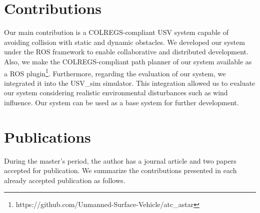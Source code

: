     
    \section{Contributions}
    
    
     Our main contribution is a \ac{COLREGS}-compliant \ac{USV} system capable of avoiding collision with static and dynamic obstacles. We developed our system under the \ac{ROS} framework to enable collaborative and distributed development. Also, we make the COLREGS-compliant path planner of our system available as a \ac{ROS} plugin\footnote{https://github.com/Unmanned-Surface-Vehicle/atc\_astar}. Furthermore, regarding the evaluation of our system, we integrated it into the USV\_sim simulator. This integration allowed us to evaluate our system considering realistic environmental disturbances such as wind influence. Our system can be used as a base system for further development.

    \section{Publications}
    
    During the master's period, the author has a journal article and two papers accepted for publication. We summarize the contributions presented in each already accepted publication as follows.
    
